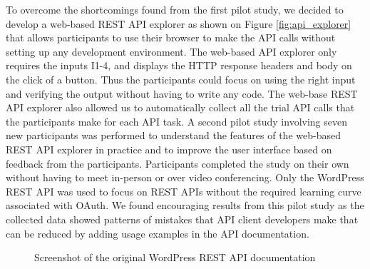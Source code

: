 \documentclass[conference]{IEEEtran}
\begin{document}
To overcome the shortcomings found from the first pilot study, we decided to develop a web-based REST API explorer as shown on Figure \ref{fig:api_explorer} that allows participants to use their browser to make the API calls without setting up any development environment. The web-based API explorer only requires the inputs I1-4, and displays the HTTP response headers and body on the click of a button. Thus the participants could focus on using the right input and verifying the output without having to write any code. The web-base REST API explorer also allowed us to automatically collect all the trial API calls that the participants make for each API task. A second pilot study involving seven new participants was performed to understand the features of the web-based REST API explorer in practice and to improve the user interface based on feedback from the participants. Participants completed the study on their own without having to meet in-person or over video conferencing. Only the WordPress REST API was used to focus on REST APIs without the required learning curve associated with OAuth. We found encouraging results from this pilot study as the collected data showed patterns of mistakes that API client developers make that can be reduced by adding usage examples in the API documentation.


\begin{figure}[t]
\begin{center}
\end{center}
\caption{Screenshot of the original WordPress REST API documentation}
\label{fig:original}
\end{figure}
\end{document}
